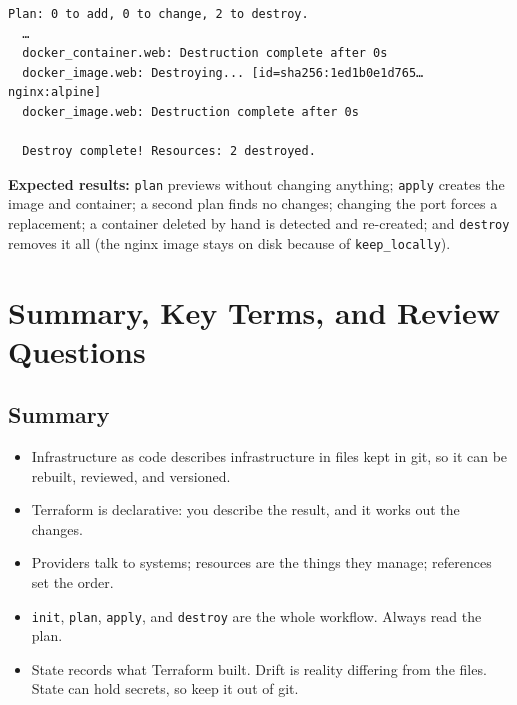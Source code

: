 \begin{enumerate}
\begin{codeblock}
\begin{Shaded}
\begin{Highlighting}[]
\end{Highlighting}
\end{Shaded}

  \end{codeblock}

  \begin{codeblock}
  \begin{Verbatim}[formatcom=\outputstyle]
  Plan: 0 to add, 0 to change, 2 to destroy.
  …
  docker_container.web: Destruction complete after 0s
  docker_image.web: Destroying... [id=sha256:1ed1b0e1d765…nginx:alpine]
  docker_image.web: Destruction complete after 0s

  Destroy complete! Resources: 2 destroyed.
  \end{Verbatim}
  \end{codeblock}
\end{enumerate}

\textbf{Expected results:} \texttt{plan} previews without changing anything; \texttt{apply} creates the image and container; a second plan finds no changes; changing the port forces a replacement; a container deleted by hand is detected and re-created; and \texttt{destroy} removes it all (the nginx image stays on disk because of \texttt{keep\_locally}).

\section{Summary, Key Terms, and Review Questions}\label{08-infrastructure-as-code:summary-key-terms-and-review-questions}

\subsection*{Summary}\label{08-infrastructure-as-code:summary}

\begin{itemize}
\tightlist
\item
  Infrastructure as code describes infrastructure in files kept in git, so it can be rebuilt, reviewed, and versioned.
\item
  Terraform is declarative: you describe the result, and it works out the changes.
\item
  Providers talk to systems; resources are the things they manage; references set the order.
\item
  \texttt{init}, \texttt{plan}, \texttt{apply}, and \texttt{destroy} are the whole workflow. Always read the plan.
\item
  State records what Terraform built. Drift is reality differing from the files. State can hold secrets, so keep it out of git.
\end{itemize}

